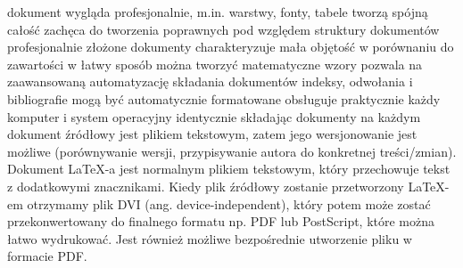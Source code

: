\documentclass{article}
\begin{document}
dokument wygląda profesjonalnie, m.in. warstwy, fonty, tabele tworzą spójną całość
zachęca do tworzenia poprawnych pod względem struktury dokumentów
profesjonalnie złożone dokumenty charakteryzuje mała objętość w porównaniu do zawartości
w łatwy sposób można tworzyć matematyczne wzory
pozwala na zaawansowaną automatyzację składania dokumentów
indeksy, odwołania i bibliografie mogą być automatycznie formatowane
obsługuje praktycznie każdy komputer i system operacyjny identycznie składając dokumenty na każdym
dokument źródłowy jest plikiem tekstowym, zatem jego wersjonowanie jest możliwe (porównywanie wersji, przypisywanie autora do konkretnej treści/zmian).
Dokument LaTeX-a jest normalnym plikiem tekstowym, który przechowuje tekst z dodatkowymi znacznikami. Kiedy plik źródłowy zostanie przetworzony LaTeX-em otrzymamy plik DVI (ang. device-independent), który potem może zostać przekonwertowany do finalnego formatu np. PDF lub PostScript, które można łatwo wydrukować. Jest również możliwe bezpośrednie utworzenie pliku w formacie PDF.
\end{document}
